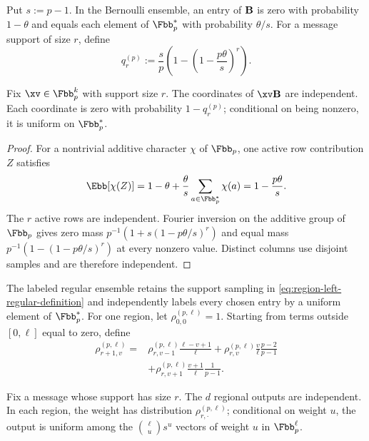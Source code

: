 Put $s:=p-1$.  In the Bernoulli ensemble, an entry of $\mathbf B$ is zero with
probability $1-\theta$ and equals each element of $\Fbb_p^*$ with probability
$\theta/s$.  For a message support of size $r$, define
\begin{equation}
 q^{(p)}_r
 :=\frac{s}{p}\left(1-
       \left(1-\frac{p\theta}{s}\right)^r\right).
 \label{eq:prime-bernoulli-activation}
\end{equation}

\begin{lemma}
\label{lem:prime-bernoulli-expander}
Fix $\xv\in\Fbb_p^k$ with support size $r$.  The coordinates of $\xv\B$
are independent.  Each coordinate is zero with probability $1-q^{(p)}_r$;
conditional on being nonzero, it is uniform on $\Fbb_p^*$.
\end{lemma}

\begin{proof}
For a nontrivial additive character $\chi$ of $\Fbb_p$, one active row
contribution $Z$ satisfies
\[
 \Ebb[\chi(Z)]
 =1-\theta+\frac{\theta}{s}\sum_{a\in\Fbb_p^*}\chi(a)
 =1-\frac{p\theta}{s}.
\]
The $r$ active rows are independent.  Fourier inversion on the additive group
of $\Fbb_p$ gives zero mass
$p^{-1}(1+s(1-p\theta/s)^r)$ and equal mass
$p^{-1}(1-(1-p\theta/s)^r)$ at every nonzero value.  Distinct columns use
disjoint samples and are therefore independent.
\end{proof}

The labeled regular ensemble retains the support sampling in
\eqref{eq:region-left-regular-definition} and independently labels every
chosen entry by a uniform element of $\Fbb_p^*$.  For one region, let
$\rho^{(p,\ell)}_{0,0}=1$.  Starting from terms outside $[0,\ell]$ equal to
zero, define
\begin{equation}
\begin{split}
 \rho^{(p,\ell)}_{r+1,v}
 ={}&\rho^{(p,\ell)}_{r,v-1}\frac{\ell-v+1}{\ell}
 +\rho^{(p,\ell)}_{r,v}\frac{v}{\ell}\frac{p-2}{p-1}\\
 &+\rho^{(p,\ell)}_{r,v+1}\frac{v+1}{\ell}\frac{1}{p-1}.
\end{split}
\label{eq:prime-regular-shell-recurrence}
\end{equation}

\begin{lemma}
\label{lem:prime-regular-shell-law}
Fix a message whose support has size $r$.  The $d$ regional outputs are
independent.  In each region, the weight has distribution
$\rho^{(p,\ell)}_{r,\cdot}$; conditional on weight $u$, the output is uniform
among the $\binom{\ell}{u}s^u$ vectors of weight $u$ in $\Fbb_p^\ell$.
\end{lemma}

